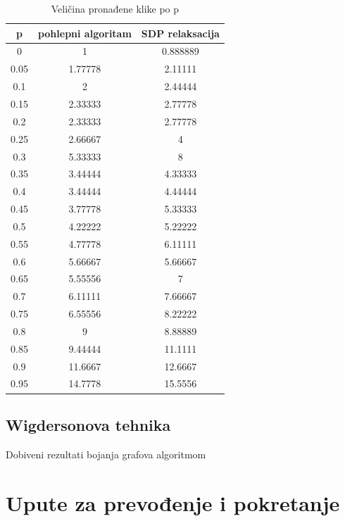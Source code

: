 \documentclass[diplomskirad]{fer}
\begin{document}
\begin{table}
  \caption{Veličina pronađene klike po p}
  \label{table:klik_p}
  \centering
  \begin{tabular}{|c|c|c|}
    \hline
    p & pohlepni algoritam & SDP relaksacija \\
    \hline
    \hline
    0 & 1 & 0.888889 \\
    \hline
    0.05 & 1.77778 & 2.11111 \\
    \hline
    0.1 & 2 & 2.44444 \\
    \hline
    0.15 & 2.33333 & 2.77778 \\
    \hline
    0.2 & 2.33333 & 2.77778 \\
    \hline
    0.25 & 2.66667 & 4 \\
    \hline
    0.3 & 5.33333 & 8 \\
    \hline
    0.35 & 3.44444 & 4.33333 \\
    \hline
    0.4 & 3.44444 & 4.44444 \\
    \hline
    0.45 & 3.77778 & 5.33333 \\
    \hline
    0.5 & 4.22222 & 5.22222 \\
    \hline
    0.55 & 4.77778 & 6.11111 \\
    \hline
    0.6 & 5.66667 & 5.66667 \\
    \hline
    0.65 & 5.55556 & 7 \\
    \hline
    0.7 & 6.11111 & 7.66667 \\
    \hline
    0.75 & 6.55556 & 8.22222 \\
    \hline
    0.8 & 9 & 8.88889 \\
    \hline
    0.85 & 9.44444 & 11.1111 \\
    \hline
    0.9 & 11.6667 & 12.6667 \\
    \hline
    0.95 & 14.7778 & 15.5556 \\
    \hline
  \end{tabular}
\end{table}

\section{Wigdersonova tehnika}
Dobiveni rezultati bojanja grafova algoritmom 

\chapter{Upute za prevođenje i pokretanje}
\label{pog:upute_za_prevođenje_i_pokretanje}
\end{document}
